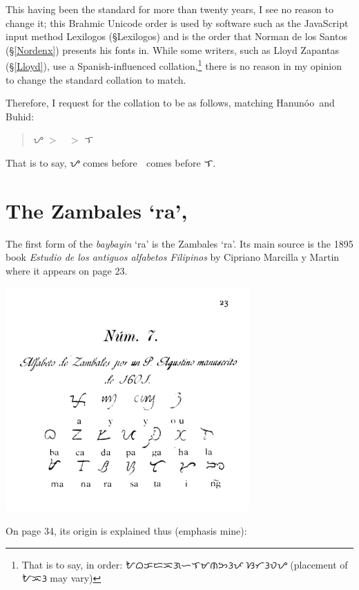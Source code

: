 \documentclass[a4paper,pagesize,openany,14pt,parskip=never]{scrbook}
\newcommand{\≈}{$\approx$}
\newcommand{\hanunoo}{Hanun\'o\textquotesingle o}
\begin{document}
This having been the standard for more than twenty years, I see no reason to change it; this Brahmic Unicode order is used by software such as the JavaScript input method Lexilogos (\S Lexilogos) and is the order that Norman de los Santos (\S\ref{Nordenx}) presents his fonts in. While some writers, such as Lloyd Zapantas (\S\ref{Lloyd}), use a Spanish-influenced collation,\footnote{That is to say, in order: {\baybayin ᜀᜊᜃᜇᜁᜄᜑᜎᜋᜈᜅᜂᜉᜍᜐᜆᜂᜏᜌ} (placement of {\baybayin ᜀᜁᜂ} may vary)} there is no reason in my opinion to change the standard collation to match.

Therefore, I request for the collation to be as follows, matching \hanunoo\ and Buhid:

\begin{quote}
    {\baybayin ᜌ} $>$ {\baybayin ᜍ} $>$ {\baybayin ᜎ}
\end{quote}

That is to say, {\baybayin ᜌ} comes before {\baybayin ᜍ} comes before {\baybayin ᜎ}.


\section{The Zambales `ra', {\baybayinh ᜍ}}

The first form of the {\em baybayin} `ra' is the Zambales `ra'. Its main source is the 1895 book {\em Estudio de los antiguos alfabetos Filipinos} by Cipriano Marcilla y Martin where it appears on page 23. 

\includegraphics[width=0.7\textwidth]{ZambalesAlphabet}

On page 34, its origin is explained thus (emphasis mine):
\end{document}
